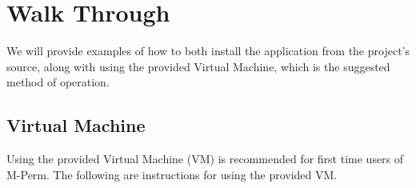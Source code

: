 \documentclass{sig-alternate-05-2015}
\newcommand{\todo}[1]{\textcolor{cyan}{\textbf{[#1]}}}
\begin{document}


\newpage




\newpage
\appendix
\section{Walk Through}


We will provide examples of how to both install the application from the project's source, along with using the provided Virtual Machine, which is the suggested method of operation.


\subsection{Virtual Machine}

Using the provided Virtual Machine (VM) is recommended for first time users of M-Perm. The following are instructions for using the provided VM.
\end{document}

